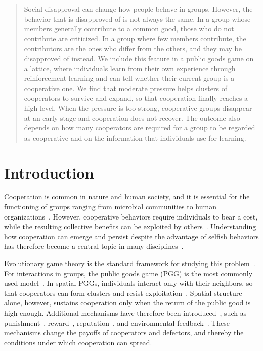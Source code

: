 \documentclass[%
  aip,cha,
  amsmath,amssymb,
  reprint,
  floatfix,
  article-title,
]{revtex4-2}
\begin{document}
\begin{quotation}
Social disapproval can change how people behave in groups. However, the behavior that is disapproved of is not always the same. In a group whose members generally contribute to a common good, those who do not contribute are criticized. In a group where few members contribute, the contributors are the ones who differ from the others, and they may be disapproved of instead. We include this feature in a public goods game on a lattice, where individuals learn from their own experience through reinforcement learning and can tell whether their current group is a cooperative one. We find that moderate pressure helps clusters of cooperators to survive and expand, so that cooperation finally reaches a high level. When the pressure is too strong, cooperative groups disappear at an early stage and cooperation does not recover. The outcome also depends on how many cooperators are required for a group to be regarded as cooperative and on the information that individuals use for learning.
\end{quotation}

\section{Introduction}\label{sec:intro}

Cooperation is common in nature and human society, and it is essential for the functioning of groups ranging from microbial communities to human organizations~\cite{axelrod1981evolution,rand2013human}.
However, cooperative behaviors require individuals to bear a cost, while the resulting collective benefits can be exploited by others~\cite{sigmund2010calculus}.
Understanding how cooperation can emerge and persist despite the advantage of selfish behaviors has therefore become a central topic in many disciplines~\cite{pennisi2005did}.

Evolutionary game theory is the standard framework for studying this problem~\cite{smith1973logic,taylor1978evolutionary,nowak2006evolutionary}.
For interactions in groups, the public goods game (PGG) is the most commonly used model~\cite{hauert2006evolutionary,szolnoki2016competition,zhu2024stochastic}.
In spatial PGGs, individuals interact only with their neighbors, so that cooperators can form clusters and resist exploitation~\cite{nowak1992evolutionary,ohtsuki2006simple,szabo2007evolutionary,szolnoki2009impact,perc2013evolutionary,perc2017statistical,zhu2025multilayer}.
Spatial structure alone, however, sustains cooperation only when the return of the public good is high enough.
Additional mechanisms have therefore been introduced~\cite{perc2010coevolutionary}, such as punishment~\cite{fehr2002altruistic,helbing2010punish,chen2014probabilistic,szolnoki2017antisocial,xie2024regulation}, reward~\cite{rand2009positive,szolnoki2010reward}, reputation~\cite{milinski2002helps,zhu2024synergy}, and environmental feedback~\cite{weitz2016oscillating,tilman2020evolutionary,wang2020eco,hu2025dynamic}.
These mechanisms change the payoffs of cooperators and defectors, and thereby the conditions under which cooperation can spread.
\end{document}
